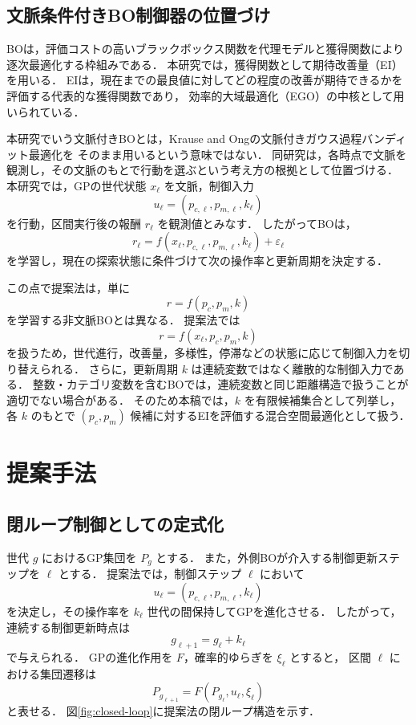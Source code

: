 \documentclass[a4paper,10pt,twocolumn]{ltjsarticle}
\begin{document}
\subsection{文脈条件付きBO制御器の位置づけ}

BOは，評価コストの高いブラックボックス関数を代理モデルと獲得関数により逐次最適化する枠組みである．
本研究では，獲得関数として期待改善量（EI）を用いる．
EIは，現在までの最良値に対してどの程度の改善が期待できるかを評価する代表的な獲得関数であり，
効率的大域最適化（EGO）の中核として用いられている\cite{jones1998}．

本研究でいう文脈付きBOとは，Krause and Ongの文脈付きガウス過程バンディット最適化\cite{krause2011}を
そのまま用いるという意味ではない．
同研究は，各時点で文脈を観測し，その文脈のもとで行動を選ぶという考え方の根拠として位置づける．
本研究では，GPの世代状態 \(x_\ell\) を文脈，制御入力
\[
  u_\ell=(p_{c,\ell},p_{m,\ell},k_\ell)
\]
を行動，区間実行後の報酬 \(r_\ell\) を観測値とみなす．
したがってBOは，
\[
  r_\ell=f(x_\ell,p_{c,\ell},p_{m,\ell},k_\ell)+\varepsilon_\ell
\]
を学習し，現在の探索状態に条件づけて次の操作率と更新周期を決定する．

この点で提案法は，単に
\[
  r=f(p_c,p_m,k)
\]
を学習する非文脈BOとは異なる．
提案法では
\[
  r=f(x_\ell,p_c,p_m,k)
\]
を扱うため，世代進行，改善量，多様性，停滞などの状態に応じて制御入力を切り替えられる．
さらに，更新周期 \(k\) は連続変数ではなく離散的な制御入力である．
整数・カテゴリ変数を含むBOでは，連続変数と同じ距離構造で扱うことが適切でない場合がある\cite{garrido2020}．
そのため本稿では，\(k\) を有限候補集合として列挙し，
各 \(k\) のもとで \((p_c,p_m)\) 候補に対するEIを評価する混合空間最適化として扱う．

\section{提案手法}

\subsection{閉ループ制御としての定式化}

世代 \(g\) におけるGP集団を \(P_g\) とする．
また，外側BOが介入する制御更新ステップを \(\ell\) とする．
提案法では，制御ステップ \(\ell\) において
\[
u_\ell=(p_{c,\ell},p_{m,\ell},k_\ell)
\]
を決定し，その操作率を \(k_\ell\) 世代の間保持してGPを進化させる．
したがって，連続する制御更新時点は
\begin{equation}
g_{\ell+1}=g_\ell+k_\ell
\end{equation}
で与えられる．
GPの進化作用を \(F\)，確率的ゆらぎを \(\xi_\ell\) とすると，
区間 \(\ell\) における集団遷移は
\begin{equation}
P_{g_{\ell+1}} = F(P_{g_\ell},u_\ell,\xi_\ell)
\end{equation}
と表せる．
図\ref{fig:closed-loop}に提案法の閉ループ構造を示す．
\end{document}
